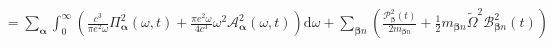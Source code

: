 \documentclass{article}
\begin{document}
\begin{equation}
\begin{split}
&= \sum_{\bm{\alpha}}\int_0^\infty\left(\frac{c^3}{\pi e^2\omega}\mathit{\Pi}_{\bm{\alpha}}^2(\omega,t) + \frac{\pi e^2\omega}{4c^3}\omega^2\mathcal{A}_{\bm{\alpha}}^2(\omega,t)\right)\mathrm{d}\omega + \sum_{\bm{\beta}n}\left(\frac{\mathcal{P}_{\bm{\beta}}^2(t)}{2m_{\bm{\beta}n}} + \frac{1}{2}m_{\bm{\beta}n}\tilde{\Omega}^2\mathcal{B}_{\bm{\beta}n}^2(t)\right)\\

\end{split}
\end{equation}
\end{document}
